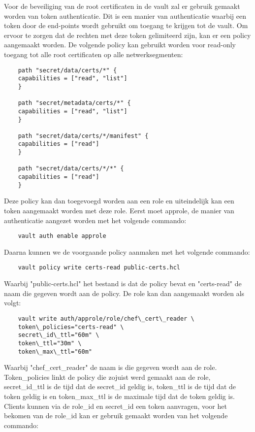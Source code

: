 Voor de beveiliging van de root certificaten in de vault zal er gebruik gemaakt worden van token authenticatie. Dit is een manier van authenticatie waarbij een token door de end-points wordt gebruikt om toegang te krijgen tot de vault.
Om ervoor te zorgen dat de rechten met deze token gelimiteerd zijn, kan er een policy aangemaakt worden. De volgende policy kan gebruikt worden voor read-only toegang tot alle root certificaten op alle netwerksegmenten:
\begin{verbatim}     
    path "secret/data/certs/*" {
    capabilities = ["read", "list"]
    }

    path "secret/metadata/certs/*" {
    capabilities = ["read", "list"]
    }

    path "secret/data/certs/*/manifest" {
    capabilities = ["read"]
    }

    path "secret/data/certs/*/*" {
    capabilities = ["read"]
    }
\end{verbatim}

Deze policy kan dan toegevoegd worden aan een role en uiteindelijk kan een token aangemaakt worden met deze role.
Eerst moet approle, de manier van authenticatie aangezet worden met het volgende commando:

\begin{verbatim}
    vault auth enable approle
\end{verbatim}

Daarna kunnen we de voorgaande policy aanmaken met het volgende commando:

\begin{verbatim}
    vault policy write certs-read public-certs.hcl
\end{verbatim}

Waarbij "public-certs.hcl" het bestand is dat de policy bevat en "certs-read" de naam die gegeven wordt aan de policy.
De role kan dan aangemaakt worden als volgt:
\begin{verbatim}
    vault write auth/approle/role/chef\_cert\_reader \
    token\_policies="certs-read" \
    secret\_id\_ttl="60m" \
    token\_ttl="30m" \
    token\_max\_ttl="60m"
\end{verbatim}
Waarbij "chef\_cert\_reader" de naam is die gegeven wordt aan de role. Token\_policies linkt de policy die zojuist werd gemaakt aan de role, secret\_id\_ttl is de tijd dat de secret\_id geldig is, token\_ttl is de tijd dat de token geldig is en token\_max\_ttl is de maximale tijd dat de token geldig is.
Clients kunnen via de role\_id en secret\_id een token aanvragen, voor het bekomen van de role\_id kan er gebruik gemaakt worden van het volgende commando:

